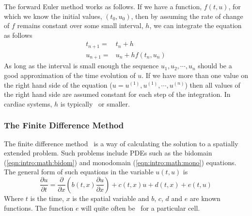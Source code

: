 The forward Euler method works as follows.
If we have a function, $f(t, u)$, for which we know the initial
values, $(t_0, u_0)$, then by assuming the rate of change of $f$ remains constant
over some small interval, $h$, we can integrate the equation as follows
\begin{subequations}
\label{eqn:intro:euler}
\begin{align}
t_{n+1} = & t_n + h \label{eqn:intro:euler:t} \\
u_{n+1} = & u_n + hf(t_n, u_n) \label{eqn:intro:euler:x}
\end{align}
\end{subequations}
As long as the interval is small enough the sequence $u_1,u_2,\cdots,u_n$
should be a good approximation of the time evolution of $u$.
If we have more than one value on the right hand side of the equation ($u =
u^{(1)}, u^{(1)}, \cdots, u^{(n)}$) then all values of the right hand side are
assumed constant for each step of the integration.
In cardiac systems, $h$ is typically \ or smaller.

\subsubsection{The Finite Difference Method}

The finite difference method~\cite{Morton2005} is a way of calculating the
solution to a spatially extended problem.
Such problems include PDEs such as the bidomain (\ref{eqn:intro:math:bidom}) and
monodomain (\ref{eqn:intro:math:mono}) equations.
The general form of such equations in the variable $u(t, u)$ is
\begin{equation}
\label{eqn:intro:fd:partial}
\frac{\partial u}{\partial t} = \frac{\partial}{\partial x} \left( b(t, x)
\frac{\partial u}{\partial x} \right) + c(t, x)u + d(t, x) + e(t, u)
\end{equation}
Where $t$ is the time, $x$ is the spatial variable and $b$, $c$, $d$ and $e$ are
known functions.
The function $e$ will quite often be \ for a particular cell.

